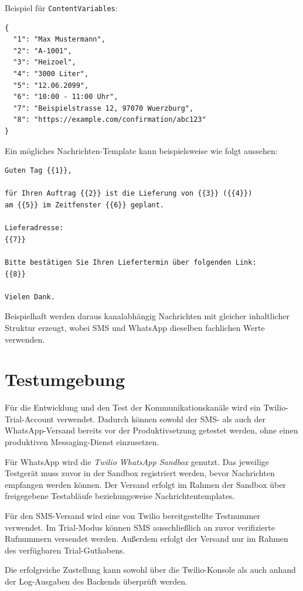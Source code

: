 \documentclass[12pt,a4paper]{article}
\begin{document}
Beispiel für \texttt{ContentVariables}:

\begin{lstlisting}[language={}]
{
  "1": "Max Mustermann",
  "2": "A-1001",
  "3": "Heizoel",
  "4": "3000 Liter",
  "5": "12.06.2099",
  "6": "10:00 - 11:00 Uhr",
  "7": "Beispielstrasse 12, 97070 Wuerzburg",
  "8": "https://example.com/confirmation/abc123"
}
\end{lstlisting}

Ein mögliches Nachrichten-Template kann beispielsweise wie folgt
aussehen:

\begin{lstlisting}[language={}]
Guten Tag {{1}},

für Ihren Auftrag {{2}} ist die Lieferung von {{3}} ({{4}})
am {{5}} im Zeitfenster {{6}} geplant.

Lieferadresse:
{{7}}

Bitte bestätigen Sie Ihren Liefertermin über folgenden Link:
{{8}}

Vielen Dank.
\end{lstlisting}

Beispielhaft werden daraus kanalabhängig Nachrichten mit
gleicher inhaltlicher Struktur erzeugt, wobei SMS und WhatsApp
dieselben fachlichen Werte verwenden.

\section{Testumgebung}

Für die Entwicklung und den Test der Kommunikationskanäle wird ein
Twilio-Trial-Account verwendet. Dadurch können sowohl der SMS- als auch
der WhatsApp-Versand bereits vor der Produktivsetzung getestet werden,
ohne einen produktiven Messaging-Dienst einzusetzen.

Für WhatsApp wird die \emph{Twilio WhatsApp Sandbox} genutzt. Das
jeweilige Testgerät muss zuvor in der Sandbox registriert werden, bevor
Nachrichten empfangen werden können. Der Versand erfolgt im Rahmen der
Sandbox über freigegebene Testabläufe beziehungsweise
Nachrichtentemplates.

Für den SMS-Versand wird eine von Twilio bereitgestellte Testnummer
verwendet. Im Trial-Modus können SMS ausschließlich an zuvor
verifizierte Rufnummern versendet werden. Außerdem erfolgt der Versand
nur im Rahmen des verfügbaren Trial-Guthabens.

Die erfolgreiche Zustellung kann sowohl über die Twilio-Konsole als auch
anhand der Log-Ausgaben des Backends überprüft werden.
\end{document}
